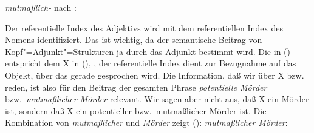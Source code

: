 \ea
\emph{mutmaßlich-} nach \citep*[]{ps2}:\\
\samepage
{}
\z

\noindent
Der referentielle Index des Adjektivs wird mit dem referentiellen Index des Nomens identifiziert.
Das ist wichtig, da der semantische Beitrag von Kopf"=Adjunkt"=Strukturen ja durch das Adjunkt
bestimmt wird. Die  in () entspricht dem X in (), \dash, der referentielle
Index dient zur Bezugnahme auf das Objekt, über das gerade gesprochen wird.  Die Information, daß
wir über X bzw.\  reden, ist also für den Beitrag der gesamten Phrase \emph{potentielle
Mörder} bzw.\ \emph{mutmaßlicher Mörder} relevant. Wir sagen aber nicht aus,
daß X ein Mörder ist, sondern daß X ein potentieller bzw.\ mutmaßlicher Mörder ist. Die Kombination von
\emph{mutmaßlicher} und \emph{Mörder} zeigt ():
\ea
\emph{mutmaßlicher Mörder}:\\
\samepage
{}
\z



